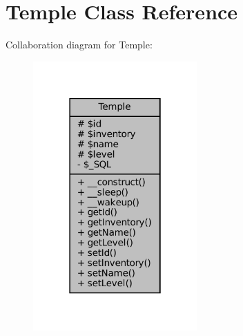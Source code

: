 \hypertarget{classTemple}{}\section{Temple Class Reference}
\label{classTemple}


Collaboration diagram for Temple\+:
\nopagebreak
\begin{figure}[H]
\begin{center}
\leavevmode
\includegraphics[width=178pt]{classTemple__coll__graph}
\end{center}
\end{figure}
